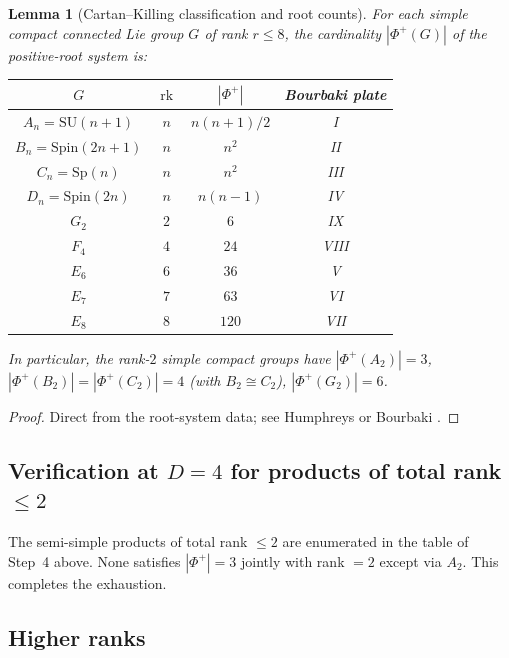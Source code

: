 \documentclass[11pt,reqno]{amsart}
\theoremstyle{plain}
\newtheorem{lemma}[theorem]{Lemma}
\theoremstyle{definition}
\theoremstyle{remark}
\newcommand{\rk}{\operatorname{rk}}
\newcommand{\SU}{\mathrm{SU}}
\begin{document}
\begin{lemma}[Cartan--Killing classification and root counts]\label{lem:cartan-killing}
For each simple compact connected Lie group $G$ of rank $r \le 8$, the cardinality $|\Phi^+(G)|$ of the positive-root system is:

\begin{center}
\begin{tabular}{cccc}
\toprule
$G$ & $\rk$ & $|\Phi^+|$ & Bourbaki plate \\
\midrule
$A_n = \SU(n+1)$ & $n$ & $n(n+1)/2$ & I \\
$B_n = \mathrm{Spin}(2n+1)$ & $n$ & $n^2$ & II \\
$C_n = \mathrm{Sp}(n)$ & $n$ & $n^2$ & III \\
$D_n = \mathrm{Spin}(2n)$ & $n$ & $n(n-1)$ & IV \\
$G_2$ & $2$ & $6$ & IX \\
$F_4$ & $4$ & $24$ & VIII \\
$E_6$ & $6$ & $36$ & V \\
$E_7$ & $7$ & $63$ & VI \\
$E_8$ & $8$ & $120$ & VII \\
\bottomrule
\end{tabular}
\end{center}

In particular, the rank-$2$ simple compact groups have $|\Phi^+(A_2)| = 3$, $|\Phi^+(B_2)| = |\Phi^+(C_2)| = 4$ (with $B_2 \cong C_2$), $|\Phi^+(G_2)| = 6$.
\end{lemma}

\begin{proof}
Direct from the root-system data; see Humphreys \cite[\S12]{Humphreys1972} or Bourbaki \cite{BourbakiLie456}.
\end{proof}

\subsection{Verification at $D = 4$ for products of total rank $\le 2$}\label{ssec:products}

The semi-simple products of total rank $\le 2$ are enumerated in the table of Step~4 above. None satisfies $|\Phi^+| = 3$ jointly with rank $= 2$ except via $A_2$. This completes the exhaustion.

\subsection{Higher ranks}\label{ssec:higher-ranks}
\end{document}
